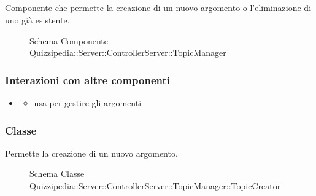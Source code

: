 \subsection{}
Componente che permette la creazione di un nuovo argomento o l'eliminazione di uno già esistente.
\begin{figure}[H]
\centering
\noindent{}
\caption[Schema Componente Quizzipedia::Server::ControllerServer::TopicManager]{Schema Componente Quizzipedia::Server::ControllerServer::TopicManager}
\end{figure}
\subsubsection{Interazioni con altre componenti}
\begin{itemize}
\item {}
\begin{itemize}
\item usa  per gestire gli argomenti
\end{itemize}
\end{itemize}
\subsubsection{Classe }
Permette la creazione di un nuovo argomento.
\begin{figure}[H]
\centering
\noindent{}
\caption[Schema Classe TopicCreator]{Schema Classe Quizzipedia::Server::ControllerServer::TopicManager::TopicCreator}
\end{figure}
